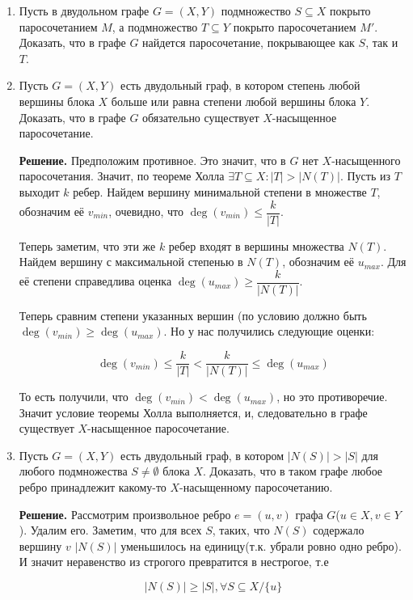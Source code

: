 \documentclass[fleqn]{article}
\begin{document}
	\begin{enumerate}
	\item Пусть в двудольном графе $G = (X, Y)$ подмножество $S \subseteq X$ покрыто паросочетанием $M$, а подмножество $T \subseteq Y$ покрыто паросочетанием $M'$. Доказать, что в графе $G$ найдется паросочетание, покрывающее как $S$, так и $T$.
	
	\item Пусть $G = (X, Y)$ есть двудольный граф, в котором степень любой вершины блока $X$ больше или равна степени любой вершины блока $Y$. Доказать, что в графе $G$ обязательно существует $X$-насыщенное паросочетание.
	
	\textbf{Решение.} Предположим противное. Это значит, что в $G$ нет $X$-насыщенного паросочетания. Значит, по теореме Холла $\exists T \subseteq X : |T| > |N(T)|$. Пусть из $T$ выходит $k$ ребер. Найдем вершину минимальной степени в множестве $T$, обозначим её $v_{min}$, очевидно, что $\deg(v_{min}) \leqslant \dfrac{k}{|T|}$.
	
	Теперь заметим, что эти же $k$ ребер входят в вершины множества $N(T)$. Найдем вершину с максимальной степенью в $N(T)$, обозначим её $u_{max}$. Для её степени справедлива оценка $\deg(u_{max}) \geqslant \dfrac{k}{|N(T)|}$.
	
	Теперь сравним степени указанных вершин (по условию должно быть $\deg(v_{min}) \geqslant \deg(u_{max})$. Но у нас получились следующие оценки:
	
	$$\deg(v_{min}) \leqslant \frac{k}{|T|} < \frac{k}{|N(T)|} \leqslant \deg(u_{max})$$
	
	То есть получили, что $\deg(v_{min}) < \deg(u_{max})$, но это противоречие. Значит условие теоремы Холла выполняется, и, следовательно в графе существует $X$-насыщенное паросочетание.
	
	\item Пусть $G = (X, Y)$ есть двудольный граф, в котором $|N(S)| > |S|$ для любого подмножества $S \neq \emptyset$	блока $X$. Доказать, что в таком графе любое ребро принадлежит какому-то $X$-насыщенному паросочетанию.
	
	\textbf{Решение.} Рассмотрим произвольное ребро $e = (u, v)$ графа $G$($u\in X, v \in Y$). Удалим его. Заметим, что для всех $S$, таких, что $N(S)$ содержало вершину $v$ $|N(S)|$ уменьшилось на единицу(т.к. убрали ровно одно ребро). И значит неравенство из строгого превратится в нестрогое, т.е 
	
	$$|N(S)| \geqslant |S|, \forall S \subseteq X/\{u\}$$
	

\end{enumerate}
\end{document}
